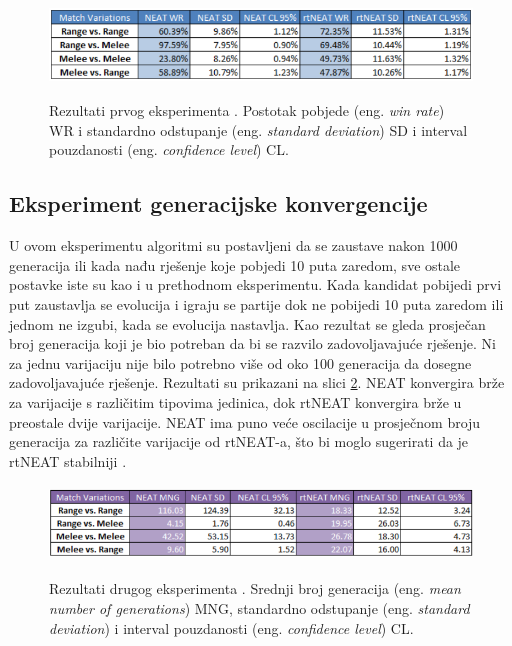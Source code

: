 \documentclass[times, utf8, seminar, numeric]{fer}
\begin{document}
\begin{figure}[ht]
  \centering
  \includegraphics[height=2cm]{slika7}\\
  \caption{Rezultati prvog eksperimenta \citep{rad5}. Postotak pobjede (eng. \textit{win rate}) WR i standardno odstupanje (eng. \textit{standard deviation}) SD i interval pouzdanosti (eng. \textit{confidence level}) CL.}
  \label{slika7}
\end{figure}

\subsection{Eksperiment generacijske konvergencije}
U ovom eksperimentu algoritmi su postavljeni da se zaustave nakon 1000 generacija ili kada nađu rješenje koje pobjedi 10 puta zaredom, sve ostale postavke iste su kao i u prethodnom eksperimentu. Kada kandidat pobijedi prvi put zaustavlja se evolucija i igraju se partije dok ne pobijedi 10 puta zaredom ili jednom ne izgubi, kada se evolucija nastavlja. Kao rezultat se gleda prosječan broj generacija koji je bio potreban da bi se razvilo zadovoljavajuće rješenje. Ni za jednu varijaciju nije bilo potrebno više od oko 100 generacija da dosegne zadovoljavajuće rješenje. Rezultati su prikazani na slici \ref{slika8}. NEAT konvergira brže za varijacije s različitim tipovima jedinica, dok rtNEAT konvergira brže u preostale dvije varijacije. NEAT ima puno veće oscilacije u prosječnom broju generacija za različite varijacije od rtNEAT-a, što bi moglo sugerirati da je rtNEAT stabilniji \citep{rad5}.

\begin{figure}[ht]
  \centering
  \includegraphics[height=2cm]{slika8}\\
  \caption{Rezultati drugog eksperimenta \citep{rad5}. Srednji broj generacija (eng. \textit{mean number of generations}) MNG, standardno odstupanje (eng. \textit{standard deviation}) i interval pouzdanosti (eng. \textit{confidence level}) CL.}
  \label{slika8}
\end{figure}
\end{document}

